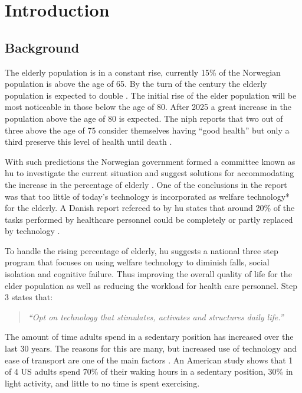 \chapter{Introduction}

\section{Background}

The elderly population is in a constant rise, currently 15\% of the Norwegian population is above the age of 65. By the turn of the century the elderly population is expected to double \cite{elder}. The initial rise of the elder population will be most noticeable in those below the age of 80. After 2025 a great increase in the population above the age of 80 is expected. The \gls{niph} reports that two out of three above the age of 75 consider themselves having ``good health'' but only a third preserve this level of health until death \cite{elder}.

With such predictions the Norwegian government formed a committee known as \gls{hu} to investigate the current situation and suggest solutions for accommodating the increase in the percentage of elderly \cite{haagen}. One of the conclusions in the report was that too little of today's technology is incorporated as welfare technology* for the elderly. A Danish report refereed to by \gls{hu} states that around 20\% of the tasks performed by healthcare personnel could be completely or partly replaced by technology \cite{kmd}.

To handle the rising percentage of elderly, \gls{hu} suggests a national three step program that focuses on using welfare technology to diminish falls, social isolation and cognitive failure. Thus improving the overall quality of life for the elder population as well as reducing the workload for health care personnel. Step 3 states that:
\begin{quote}
\textit{``Opt on technology that stimulates, activates and structures daily life.''}
\end{quote}

The amount of time adults spend in a sedentary position has increased over the last 30 years. The reasons for this are many, but increased use of technology and ease of transport are one of the main factors \cite{sedentaryBehaviour}. An American study shows that 1 of 4 US adults spend 70\% of their waking hours in a sedentary position, 30\% in light activity, and little to no time is spent exercising.

